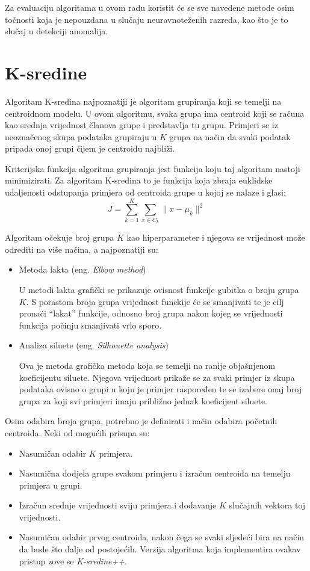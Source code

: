 \documentclass[utf8, diplomski, numeric]{fer}
\begin{document}
Za evaluaciju algoritama u ovom radu koristit će se sve navedene metode osim točnosti koja je nepouzdana u slučaju neuravnoteženih razreda, kao što je to slučaj u detekciji anomalija.

\section{K-sredine}
Algoritam K-sredina najpoznatiji je algoritam grupiranja koji se temelji na centroidnom modelu. U ovom algoritmu, svaka grupa ima centroid koji se računa kao srednja vrijednost članova grupe i predstavlja tu grupu. Primjeri se iz neoznačenog skupa podataka grupiraju u $K$ grupa na način da svaki podatak pripada onoj grupi čijem je centroidu najbliži. 

Kriterijska funkcija algoritma grupiranja jest funkcija koju taj algoritam nastoji minimizirati. Za algoritam K-sredina to je funkcija koja zbraja euklidske udaljenosti odstupanja primjera od centroida grupe u kojoj se nalaze i glasi:
\begin{equation*} \label{eq:silouette}
J = \sum_{k = 1}^{K}\sum_{x \in C_k} \lVert x - \mu_k \rVert ^{2}
\end{equation*}

Algoritam očekuje broj grupa $K$ kao hiperparameter i njegova se vrijednost može odrediti na više načina, a najpoznatiji su:
\begin{itemize}
\item Metoda lakta (eng. \textit{Elbow method})

U metodi lakta grafički se prikazuje ovisnost funkcije gubitka o broju grupa $K$. S porastom broja grupa vrijednost funckije će se smanjivati te je cilj pronaći ``lakat'' funkcije, odnosno broj grupa nakon kojeg se vrijednosti funkcija počinju smanjivati vrlo sporo.

\item Analiza siluete (eng. \textit{Silhouette analysis})

Ova je metoda grafička metoda koja se temelji na ranije objašnjenom koeficijentu siluete. Njegova vrijednost prikaže se za svaki primjer iz skupa podataka ovisno o grupi u koju je primjer raspoređen te se izabere onaj broj grupa za koji svi primjeri imaju približno jednak koeficijent siluete.

\end{itemize}

Osim odabira broja grupa, potrebno je definirati i način odabira početnih centroida. Neki od mogućih prisupa su:
\begin{itemize}
\item Nasumičan odabir $K$ primjera.
\item Nasumična dodjela grupe svakom primjeru i izračun centroida na temelju primjera u grupi.
\item Izračun srednje vrijednosti sviju primjera i dodavanje $K$ slučajnih vektora toj vrijednosti.
\item Nasumičan odabir prvog centroida, nakon čega se svaki sljedeći bira na način da bude što dalje od postojećih. Verzija algoritma koja implementira ovakav pristup zove se \textit{K-sredine++}.

\end{itemize}
\end{document}
